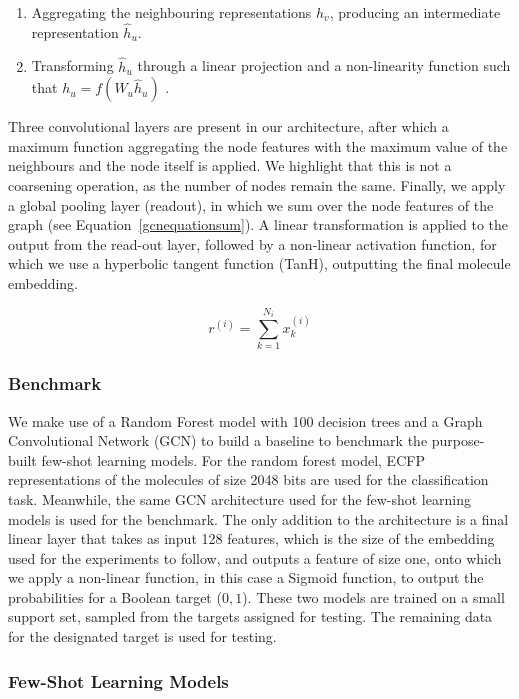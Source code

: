 \documentclass[journal=acscii,manuscript=article]{achemso}
\begin{document}
\begin{enumerate}
    \item Aggregating the neighbouring representations $h_v$, producing an intermediate representation $\hat{h}_u$.
    \item Transforming $\hat{h}_u$ through a linear projection and a non-linearity function such that $h_u = f(W_u \hat{h}_u)$ \citep{kipf2016semi}.
\end{enumerate}

Three convolutional layers are present in our architecture, after which a maximum function aggregating the node features with the maximum value of the neighbours and the node itself is applied. We highlight that this is not a coarsening operation, as the number of nodes remain the same. Finally, we apply a global pooling layer (readout), in which we sum over the node features of the graph (see Equation~\ref{gcnequationsum}). A linear transformation is applied to the output from the read-out layer, followed by a non-linear activation function, for which we use a hyperbolic tangent function (TanH), outputting the final molecule embedding.

\begin{equation}
\label{gcnequationsum}
r^{(i)} = \sum_{k=1}^{N_i} x^{(i)}_k
\end{equation}


\subsubsection{Benchmark}

We make use of a Random Forest model with 100 decision trees and a Graph Convolutional Network (GCN) to build a baseline to benchmark the purpose-built few-shot learning models. For the random forest model, ECFP representations of the molecules of size 2048 bits are used for the classification task. Meanwhile, the same GCN architecture used for the few-shot learning models is used for the benchmark. The only addition to the architecture is a final linear layer that takes as input 128 features, which is the size of the embedding used for the experiments to follow, and outputs a feature of size one, onto which we apply a non-linear function, in this case a Sigmoid function, to output the probabilities for a Boolean target (${0, 1}$). These two models are trained on a small support set, sampled from the targets assigned for testing. The remaining data for the designated target is used for testing.

\subsubsection{Few-Shot Learning Models}
\end{document}
